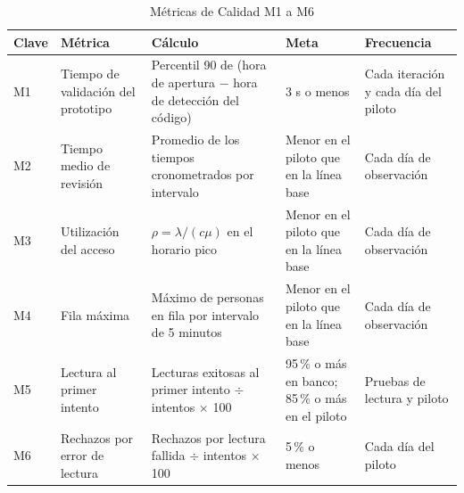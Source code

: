 \begin{table}[tbp]
	\caption{Métricas de Calidad M1 a M6}
	\label{tab:met1}
	\small\setlength{\tabcolsep}{3pt}
	\begin{tabular}{P{0.9cm}P{2.8cm}P{4.4cm}P{3.4cm}P{3.3cm}}
		\toprule
		Clave & Métrica & Cálculo & Meta & Frecuencia \\
		\midrule
		M1 & Tiempo de validación del prototipo & Percentil 90 de (hora de apertura $-$ hora de detección del código) & 3 s o menos & Cada iteración y cada día del piloto \\
		M2 & Tiempo medio de revisión & Promedio de los tiempos cronometrados por intervalo & Menor en el piloto que en la línea base & Cada día de observación \\
		M3 & Utilización del acceso & $\rho = \lambda / (c\mu)$ en el horario pico & Menor en el piloto que en la línea base & Cada día de observación \\
		M4 & Fila máxima & Máximo de personas en fila por intervalo de 5 minutos & Menor en el piloto que en la línea base & Cada día de observación \\
		M5 & Lectura al primer intento & Lecturas exitosas al primer intento $\div$ intentos $\times$ 100 & 95\,\% o más en banco; 85\,\% o más en el piloto & Pruebas de lectura y piloto \\
		M6 & Rechazos por error de lectura & Rechazos por lectura fallida $\div$ intentos $\times$ 100 & 5\,\% o menos & Cada día del piloto \\
		\bottomrule
	\end{tabular}
\end{table}

